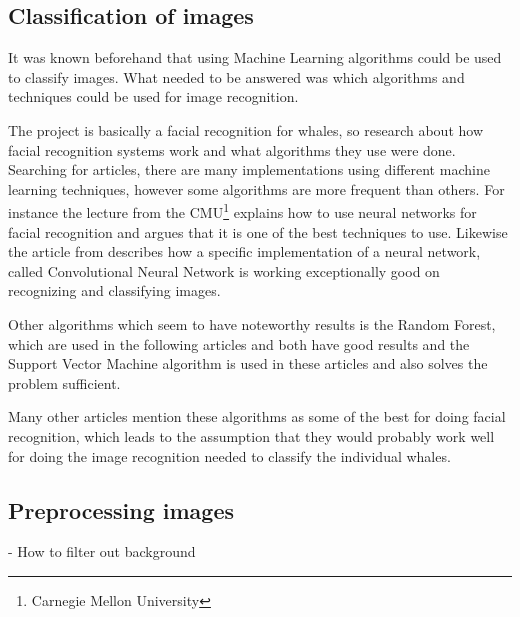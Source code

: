 \subsection{Classification of images}
It was known beforehand that using Machine Learning algorithms could be used to classify images. What needed to be answered was which algorithms and techniques could be used for image recognition. 

The project is basically a facial recognition for whales, so research about how facial recognition systems work and what algorithms they use were done. Searching for articles, there are many implementations using different machine learning techniques, however some algorithms are more frequent than others. For instance the lecture from the CMU\footnote{Carnegie Mellon University} \cite{lit:nn1} explains how to use neural networks for facial recognition and argues that it is one of the best techniques to use. Likewise the article from \cite{lit:nn2} describes how a specific implementation of a neural network, called Convolutional Neural Network is working exceptionally good on recognizing and classifying images. 

Other algorithms which seem to have noteworthy results is the Random Forest, which are used in the following articles \cite{lit:rn1} and \cite{lit:rn2} both have good results and the Support Vector Machine algorithm is used in these articles \cite{lit:svm1} and \cite{lit:svm2} also solves the problem sufficient.

Many other articles mention these algorithms as some of the best for doing facial recognition, which leads to the assumption that they would probably work well for doing the image recognition needed to classify the individual whales.





\subsection{Preprocessing images}
\label{sec:litterature}
- How to filter out background